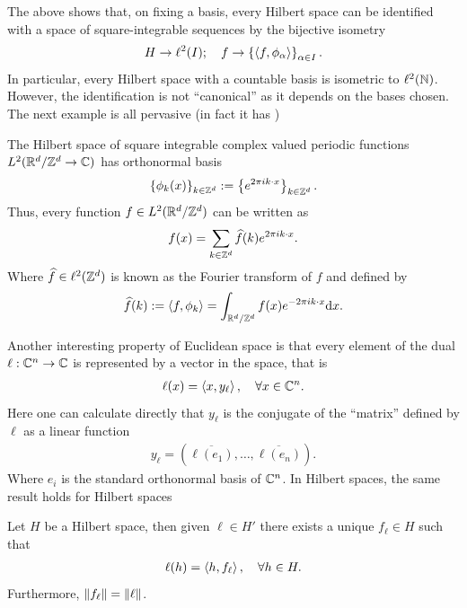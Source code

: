 \documentclass[
    a4paper,
    DIV=14,
    abstract=true,
    numbers=noenddot
]{scrartcl}
\begin{document}
	The above shows that, on fixing a basis, every Hilbert space can be identified with a space of square-integrable sequences by the bijective isometry
	\begin{align*}
		H\to \ell ^2(I); \quad f \to \left\{\left\langle f,\phi_{\alpha}\right\rangle\right\}_{\alpha \in I}.
	\end{align*}
	In particular, every Hilbert space with a countable basis is isometric to $\ell ^2(\mathbb{N})$. However, the identification is not ``canonical'' as it depends on the bases chosen. The next example is all pervasive (in fact it has )
	\begin{example}[Plancherel]
		The Hilbert space of square integrable complex valued periodic functions $L^2(\mathbb{R}^d /\mathbb{Z}^d \to \mathbb{C})$ has orthonormal basis
		\begin{align*}
			\left\{\phi_k(x)\right\}_{k \in \mathbb{Z}^d}:=\left\{e^{2\pi i  k \cdot x }\right\}_{k \in \mathbb{Z}^d}.
		\end{align*}
		Thus, every function $f \in L^2(\mathbb{R}^d /\mathbb{Z}^d) $ can be written as
		\begin{align*}
			f(x)= \sum_{k \in  \mathbb{Z}^d}\widehat{f}(k)e^{2\pi i  k \cdot x } .
		\end{align*}
		Where  $\widehat{f} \in \ell ^2(\mathbb{Z}^d)$ is known as the Fourier transform of $f$ and defined by
		\begin{align*}
			\widehat{f}(k):= \left\langle f, \phi_k\right\rangle= \int_{\mathbb{R}^d/ \mathbb{Z}^d} f(x)e^{-2 \pi i k \cdot x} \mathrm{d} x .
		\end{align*}
	\end{example}
	Another interesting property of Euclidean space is that every element of the dual $\ell :\mathbb{C}^n \to \mathbb{C}$ is represented by a vector in the space, that is
	\begin{align*}
		\ell (x)= \left\langle x,y_\ell \right\rangle, \quad\forall  x \in \mathbb{C}^n.
	\end{align*}
	Here one can calculate directly that $y_\ell $ is the conjugate of the ``matrix'' defined by $\ell $ as a linear function
	\begin{align*}
		y_\ell =(\overline{\ell (e_1)},\ldots,\overline{\ell (e_n)}) .
	\end{align*}
	Where $e_i$ is the standard orthonormal basis of  $\mathbb{C}^n$. In Hilbert spaces, the same result holds for Hilbert spaces
	\begin{theorem}\label{riesz theorem}
		Let $H$ be a Hilbert space, then given $\ell \in H'$ there exists a unique $f_\ell \in H$ such that
		\begin{align}\label{riesz}
			\ell(h) = \left\langle h,f_\ell \right\rangle, \quad\forall h \in H.
		\end{align}
		Furthermore, $\left\lVert f_\ell  \right\rVert=\left\lVert \ell  \right\rVert$.
	\end{theorem}
\end{document}
